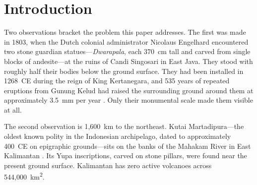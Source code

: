 \documentclass[12pt,a4paper]{article}
\begin{document}
\begin{abstract}
The paper's core deliverable is a research program: OSL dating of soil profiles, tephrochronology in sediment cores, and targeted coring at non-monumental settlement candidates. These are the studies that would upgrade ``preliminary anchors'' to a validated Java-wide rate. We intend the argument as an invitation to archaeological, geomorphological, and institutional actors---particularly those with access to the Merapi, Kelud, Sundoro, and Bromo-Tengger basins---to treat the detection-horizon question as one worth direct empirical testing rather than continued assumption either way.

\medskip
\noindent\textbf{Keywords:} volcanic taphonomy; cumulative sedimentation; detection horizon; Java; Kutai; Liangan; Island Southeast Asian archaeology; research program
\end{abstract}


\section{Introduction}

Two observations bracket the problem this paper addresses. The first was made in 1803, when the Dutch colonial administrator Nicolaus Engelhard encountered two stone guardian statues---\textit{Dwarapala}, each 370~cm tall and carved from single blocks of andesite---at the ruins of Candi Singosari in East Java. They stood with roughly half their bodies below the ground surface. They had been installed in 1268~CE during the reign of King Kertanegara, and 535 years of repeated eruptions from Gunung Kelud had raised the surrounding ground around them at approximately 3.5~mm per year \citep{kinney2003}. Only their monumental scale made them visible at all.

The second observation is 1,600~km to the northeast. Kutai Martadipura---the oldest known polity in the Indonesian archipelago, dated to approximately 400~CE on epigraphic grounds---sits on the banks of the Mahakam River in East Kalimantan \citep{vogel1918,coedes1968}. Its Yupa inscriptions, carved on stone pillars, were found near the present ground surface. Kalimantan has zero active volcanoes across 544,000~km\textsuperscript{2}.
\end{document}
